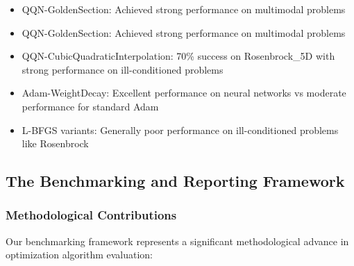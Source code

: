 \begin{enumerate}
  \begin{itemize}
  \tightlist
  \item
    QQN-GoldenSection: Achieved strong performance on multimodal problems
  \item
    QQN-GoldenSection: Achieved strong performance on multimodal problems
  \item
    QQN-CubicQuadraticInterpolation: 70\% success on Rosenbrock\_5D with strong performance on ill-conditioned problems
  \item
    Adam-WeightDecay: Excellent performance on neural networks vs moderate performance for standard Adam
  \item
    L-BFGS variants: Generally poor performance on ill-conditioned problems like Rosenbrock
  \end{itemize}
\end{enumerate}

\hypertarget{the-benchmarking-and-reporting-framework}{%
\subsection{The Benchmarking and Reporting Framework}\label{the-benchmarking-and-reporting-framework}}

\hypertarget{methodological-contributions}{%
\subsubsection{Methodological Contributions}\label{methodological-contributions}}

Our benchmarking framework represents a significant methodological advance in optimization algorithm evaluation:


